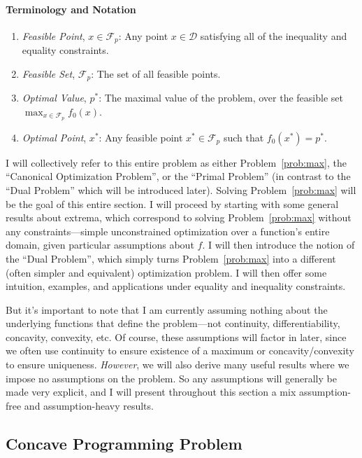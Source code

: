 \documentclass[12pt]{article}
\numberwithin{equation}{section} %
\theoremstyle{plain}
\theoremstyle{definition}
\theoremstyle{remark}
\begin{document}
\paragraph{Terminology and Notation}
\begin{enumerate}
  \item \emph{Feasible Point}, $x\in\mathscr{F}_p$: Any point
    $x\in\mathcal{D}$ satisfying all of the inequality and equality
    constraints.
  \item \emph{Feasible Set}, $\mathscr{F}_p$: The set of all feasible
    points.
  \item \emph{Optimal Value}, $p^*$: The maximal value of the problem,
    over the feasible set $\max_{x\in \mathscr{F}_p} f_0(x)$.
  \item \emph{Optimal Point}, $x^*$: Any feasible point
    $x^*\in\mathscr{F}_p$ such that $f_0(x^*)=p^*$.
\end{enumerate}
I will collectively refer to this entire problem as either
Problem~\ref{prob:max}, the ``Canonical Optimization Problem'', or the
``Primal Problem'' (in contrast to the ``Dual Problem'' which will be
introduced later). Solving Problem~\ref{prob:max} will be the goal of
this entire section. I will proceed by starting with some general
results about extrema, which correspond to solving
Problem~\ref{prob:max} without any constraints---simple unconstrained
optimization over a function's entire domain, given particular
assumptions about $f$. I will then introduce the notion of the ``Dual
Problem'', which simply turns Problem~\ref{prob:max} into a different
(often simpler and equivalent) optimization problem. I will then offer
some intuition, examples, and applications under equality and inequality
constraints.

But it's important to note that I am currently assuming nothing about
the underlying functions that define the problem---not continuity,
differentiability, concavity, convexity, etc. Of course, these
assumptions will factor in later, since we often use continuity to
ensure existence of a maximum or concavity/convexity to ensure
uniqueness. \emph{However}, we will also derive many useful results
where we impose no assumptions on the problem. So any assumptions will
generally be made very explicit, and I will present throughout this
section a mix assumption-free and assumption-heavy results.

\subsection{Concave Programming Problem}
\end{document}
